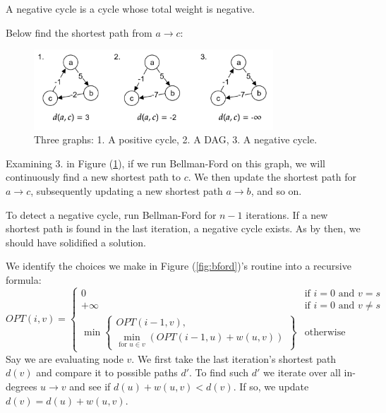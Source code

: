 \newpage

\begin{Def}

    A negative cycle is a cycle whose total weight is negative.
\end{Def}

\noindent
Below find the shortest path from $a\to c$:
\begin{figure}[h]
    \centering
    \includegraphics[width=0.8\textwidth]{Sections/dp/negcyc.png}
    \caption{Three graphs: 1. A positive cycle, 2. A DAG, 3. A negative cycle.}
    \label{fig:ncycle}
\end{figure}

\noindent
Examining 3. in Figure (\ref{fig:ncycle}), if we run Bellman-Ford on this graph, we will continuously find a new shortest path to $c$.
We then update the shortest path for $a\to c$, subsequently updating a new shortest path $a\to b$, and so on.
\begin{theo}

    To detect a negative cycle, run Bellman-Ford for $n-1$ iterations. If a new shortest path is found in the last iteration, a negative cycle exists. As by then,
    we should have solidified a solution.
\end{theo}
\noindent
We identify the choices we make in Figure (\ref{fig:bford})'s routine into a recursive formula:
\[
OPT(i, v) = 
\begin{cases} 
0 & \text{if } i = 0 \text{ and } v = s \\ 
+\infty & \text{if } i = 0 \text{ and } v \neq s \\
\min \left\{ 
\begin{array}{l}
OPT(i - 1, v), \\
{\displaystyle \min_{\text{for } u\in v}} {\left( OPT(i - 1, u) + w(u, v) \right)}
\end{array} 
\right\} & \text{otherwise}
\end{cases}
\]
\noindent
Say we are evaluating node $v$. We first take the last iteration's shortest path $d(v)$ and compare it to possible paths $d'$. To 
find such $d'$ we iterate over all in-degrees $u\to v$ and see if $d(u)+w(u,v)<d(v)$. If so, we update $d(v)=d(u)+w(u,v)$.\\


